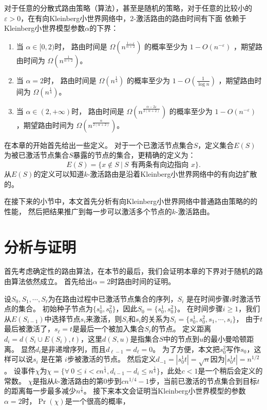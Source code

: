 \begin{theorem}\label{thm:routing}
对于任意的分散式路由策略（算法），甚至是随机的策略，对于任意的比较小的$\varepsilon > 0$，在有向Kleinberg小世界网络中，$2$-激活路由的路由时间有下面
依赖于Kleinberg小世界模型参数$\alpha$的下界：


\begin{enumerate}
\item
当 $\alpha\in [0,2)$时， 路由时间是 $\Omega( n^{\frac{1-\varepsilon}{\alpha + 2}})$ 的概率至少为 $1-O(n^{-\varepsilon})$ 
，期望路由时间为 $\Omega( n^{\frac{1}{\alpha + 2}})$。
\item
当 $\alpha = 2$时， 路由时间是 $\Omega(n^{\frac{1}{4}})$ 的概率至少为 $1-O(\frac{1}{\log n})$ 
，期望路由时间为 $\Omega(n^{\frac{1}{4}})$。
\item
当 $\alpha\in (2,+\infty)$时， 路由时间是 $\Omega( n^{\frac{\alpha-2\varepsilon}{2(\alpha+2)}})$ 的概率至少为 $1-O(n^{-\varepsilon})$ 
，期望路由时间为 $\Omega( n^{\frac{\alpha}{2(\alpha+2)}})$。

\end{enumerate}
\end{theorem}


在本章的开始首先给出一些定义。
对于一个已激活节点集合$S$，定义集合$E(S)$为被已激活节点集合$S$暴露的节点的集合，更精确的定义为：
$$E(S) = \{x\notin S\ |\ S \mbox{ 有两条有向边指向 } x\}.$$
从$E(S)$的定义可以知道$k$-激活路由是沿着Kleinberg小世界网络中的有向边扩散的。

在接下来的小节中，本文首先分析有向Kleinberg小世界网络中普通路由策略的的性能，
然后把结果推广到每一步可以激活多个节点的$k$-激活路由。



\section{分析与证明}
首先考虑确定性的路由算法，在本节的最后，我们会证明本章的下界对于随机的路由算法依然成立。
首先给出$\alpha = 2$时路由时间的证明。

设$S_0, S_1,\cdots, S_{\ell}$为在路由过程中已激活节点集合的序列，$S_i$ 是在时间步骤$i$时激活节点的集合。
初始种子节点为$\{s_0^1,s_0^2\}$，因此$S_0 = \{s_0^1,s_0^2\}$。
在时间步骤$i \geq 1$，我们从$E(S_{i-1})$中选择节点$s_{i}$来激活，则$S_i$和$s_i$的关系为$S_i = \{s_0^1,s_0^2,s_1,\cdots,s_{i}\}$，
由于$t$最后被激活了，$s_{\ell}=t$是最后一个被加入集合$S_{\ell}$的节点。
定义距离$d_i = d(S_i \cup E(S_i),t)$，这里$d(S,u)$是指集合$S$中的节点到$u$的最小曼哈顿距离。
显然$d_i$是非递增序列，而且$d_{\ell-1} = d_{\ell}= 0$。
为了方便，本文把$s_0^2$写作$s_0$，这样可以说$s_i$ 是在第 $i$步被激活的节点。
然后定义$d_{-1} = |s_0^1t| = \sqrt{n}$因为$|s_0^1t| = n^{1/2}$。
设事件$\chi$为$\chi = \{\forall~0 \leq i < cn^{\frac{1}{4}}, d_{i-1}-d_{i}\leq n^{\frac{1}{4}}\}$，此处$c<1$是一个稍后会定义的常数。
$\chi$是指从$k$-激活路由的第$0$步到$cn^{1/4}-1$步，当前已激活的节点集合到目标$t$的距离每一步最多减少$n^{\frac{1}{4}}$。
接下来本文会证明当Kleinberg小世界模型的参数$\alpha = 2$时，$\Pr(\chi)$是一个很高的概率，



